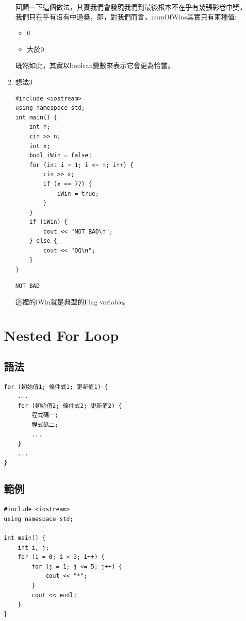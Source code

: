 \documentclass[a4paper,12pt]{article}
\begin{document}
\begin{enumerate}
回顧一下這個做法，其實我們會發現我們到最後根本不在乎有幾張彩卷中奬，我們只在乎有沒有中過奬，即，對我們而言，numOfWins其實只有兩種值:\\
\begin{itemize}
\item 0\\
\item 大於0\\
\end{itemize}
既然如此，其實以boolean變數來表示它會更為恰當。\\
\item 想法3
\label{sec:orgbce519d}
\lstset{breaklines=true,language=cpp,label= ,caption= ,captionpos=b,firstnumber=1,numbers=left}
\begin{lstlisting}
#include <iostream>
using namespace std;
int main() {
    int n;
    cin >> n;
    int x;
    bool iWin = false;
    for (int i = 1; i <= n; i++) {
        cin >> x;
        if (x == 77) {
            iWin = true;
        }
    }
    if (iWin) {
        cout << "NOT BAD\n";
    } else {
        cout << "QQ\n";
    }
}
\end{lstlisting}

\begin{verbatim}
NOT BAD
\end{verbatim}

這裡的iWin就是典型的Flag variable。\\
\end{enumerate}

\section{Nested For Loop}
\label{cpp_nested_for}
\subsection{語法}
\label{sec:org1f3d564}
\lstset{breaklines=true,language=cpp,label= ,caption= ,captionpos=b,firstnumber=1,numbers=left}
\begin{lstlisting}
for (初始值1; 條件式1; 更新值1) {
    ...
    for (初始值2; 條件式2; 更新值2) {
        程式碼一;
        程式碼二;
        ...
    }
    ...
}
\end{lstlisting}
\subsection{範例}
\label{sec:org086a905}
\lstset{breaklines=true,language=cpp,label= ,caption= ,captionpos=b,firstnumber=1,numbers=left}
\begin{lstlisting}
#include <iostream>
using namespace std;

int main() {
    int i, j;
    for (i = 0; i < 3; i++) {
        for (j = 1; j <= 5; j++) {
            cout << "*";
        }
        cout << endl;
    }
}
\end{lstlisting}
\end{document}
